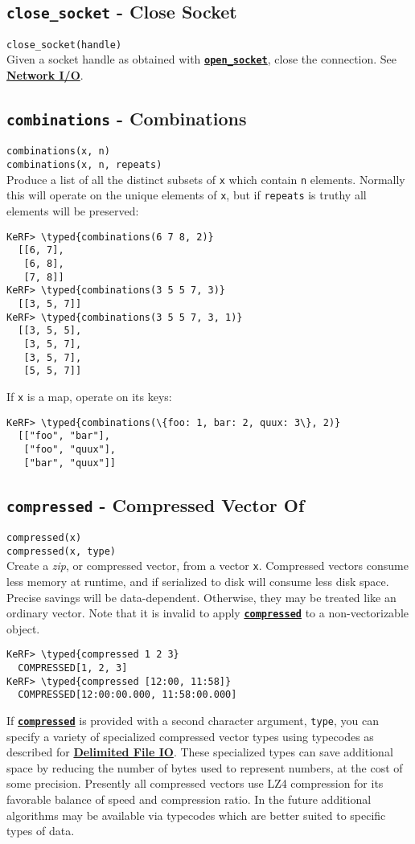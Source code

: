 \documentclass{article}
\newcommand{\typed}[1]{\textcolor{TealBlue}{#1}}
\newcommand{\primdefu}[3]{\subsection{\texttt{#1} - #2}\label{prim:#3}}
\newcommand{\primu}[2]{\hyperref[prim:#2]{\textbf{\texttt{#1}}}}
\newcommand{\primdef}[2]{\primdefu{#1}{#2}{#1}}
\newcommand{\prim}[1]{\primu{#1}{#1}}
\begin{document}
\primdefu{close\_socket}{Close Socket}{closeSocket}
\texttt{close\_socket(handle)}\\

Given a socket handle as obtained with \primu{open\_socket}{openSocket}, close the connection. See \hyperref[sec:netio]{\textbf{Network I/O}}.

\pagebreak
\primdef{combinations}{Combinations}
\texttt{combinations(x, n)}\\
\texttt{combinations(x, n, repeats)}\\

Produce a list of all the distinct subsets of \texttt{x} which contain \texttt{n} elements. Normally this will operate on the unique elements of \texttt{x}, but if \texttt{repeats} is truthy all elements will be preserved:
\begin{Verbatim}
KeRF> \typed{combinations(6 7 8, 2)}
  [[6, 7], 
   [6, 8], 
   [7, 8]]
KeRF> \typed{combinations(3 5 5 7, 3)}
  [[3, 5, 7]]
KeRF> \typed{combinations(3 5 5 7, 3, 1)}
  [[3, 5, 5], 
   [3, 5, 7], 
   [3, 5, 7], 
   [5, 5, 7]]
\end{Verbatim}

If \texttt{x} is a map, operate on its keys:
\begin{Verbatim}
KeRF> \typed{combinations(\{foo: 1, bar: 2, quux: 3\}, 2)}
  [["foo", "bar"], 
   ["foo", "quux"], 
   ["bar", "quux"]]
\end{Verbatim}

\primdef{compressed}{Compressed Vector Of}
\texttt{compressed(x)}\\
\texttt{compressed(x, type)}\\

Create a \emph{zip}, or compressed vector, from a vector \texttt{x}. Compressed vectors consume less memory at runtime, and if serialized to disk will consume less disk space. Precise savings will be data-dependent. Otherwise, they may be treated like an ordinary vector. Note that it is invalid to apply \prim{compressed} to a non-vectorizable object.
\begin{Verbatim}
KeRF> \typed{compressed 1 2 3}
  COMPRESSED[1, 2, 3]
KeRF> \typed{compressed [12:00, 11:58]}
  COMPRESSED[12:00:00.000, 11:58:00.000]
\end{Verbatim}

If \prim{compressed} is provided with a second character argument, \texttt{type}, you can specify a variety of specialized compressed vector types using typecodes as described for \hyperref[sec:fieldcodes]{\textbf{Delimited File IO}}. These specialized types can save additional space by reducing the number of bytes used to represent numbers, at the cost of some precision. Presently all compressed vectors use LZ4 compression for its favorable balance of speed and compression ratio. In the future additional algorithms may be available via typecodes which are better suited to specific types of data.
\end{document}
